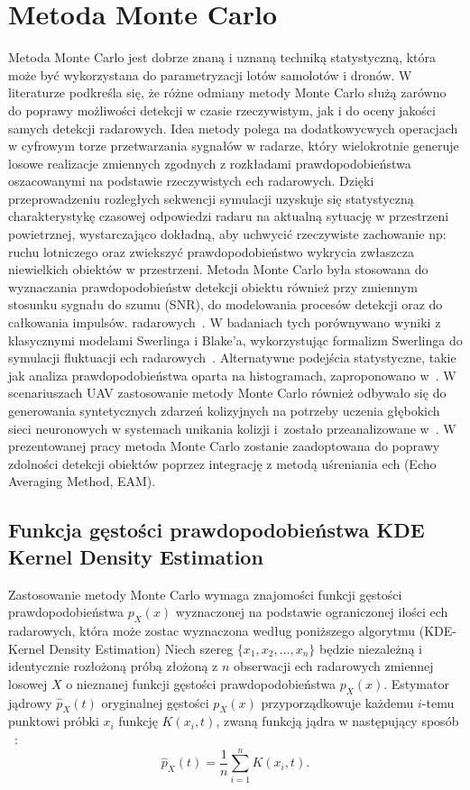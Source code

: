 
\section{Metoda Monte Carlo}
Metoda Monte Carlo jest dobrze znaną i uznaną techniką statystyczną, która może być wykorzystana do parametryzacji lotów samolotów i dronów. W literaturze podkreśla się, że różne odmiany metody Monte Carlo służą zarówno do poprawy możliwości detekcji w czasie rzeczywistym, jak i do oceny jakości samych detekcji radarowych. Idea metody polega na  dodatkowycwych operacjach  w cyfrowym torze przetwarzania sygnałów w radarze, który wielokrotnie generuje losowe realizacje zmiennych zgodnych z rozkładami prawdopodobieństwa oszacowanymi na podstawie rzeczywistych ech radarowych. Dzięki przeprowadzeniu rozległych sekwencji symulacji uzyskuje się statystyczną charakterystykę czasowej odpowiedzi radaru na aktualną sytuację w przestrzeni powietrznej, wystarczająco dokładną, aby uchwycić rzeczywiste zachowanie np: ruchu lotniczego oraz zwiekszyć prawdopodobieństwo wykrycia zwłaszcza niewielkich obiektów w przestrzeni.
Metoda Monte Carlo była stosowana do wyznaczania prawdopodobieństw detekcji obiektu również przy zmiennym stosunku sygnału do szumu (SNR), do modelowania procesów detekcji oraz do całkowania impulsów. radarowych~\cite{MC_Radar_Integracja}. W badaniach tych porównywano wyniki z klasycznymi modelami Swerlinga i Blake'a, wykorzystując formalizm Swerlinga do symulacji fluktuacji ech radarowych~\cite{Swerling1960}. Alternatywne podejścia statystyczne, takie jak analiza prawdopodobieństwa oparta na histogramach, zaproponowano w~\cite{HistogramApproach}. W scenariuszach UAV zastosowanie metody Monte Carlo również odbywało się do generowania syntetycznych zdarzeń kolizyjnych na potrzeby uczenia głębokich sieci neuronowych w systemach unikania kolizji i~zostało przeanalizowane w~\cite{MC_UAV_Collision}. 
W prezentowanej pracy metoda Monte Carlo zostanie zaadoptowana do poprawy zdolności detekcji obiektów poprzez integrację z metodą uśreniania ech (Echo Averaging Method, EAM). 

\subsection{Funkcja gęstości prawdopodobieństwa KDE Kernel Density Estimation}
Zastosowanie metody Monte Carlo wymaga znajomości funkcji gęstości prawdopodobieństwa \(p_X(x)\) wyznaczonej na podstawie ograniczonej ilości ech radarowych, która może zostac wyznaczona według poniższego algorytmu (KDE- Kernel Density Estimation)
Niech szereg \(\{x_1,x_2,\dots,x_n\}\) będzie niezależną i identycznie rozłożoną próbą złożoną z \(n\) obserwacji ech radarowych zmiennej losowej \(X\) o nieznanej funkcji gęstości prawdopodobieństwa \(p_X(x)\). Estymator jądrowy \(\hat p_X(t)\) oryginalnej gęstości \(p_X(x)\) przyporządkowuje każdemu \(i\)-temu punktowi próbki \(x_i\) funkcję \(K(x_i,t)\), zwaną funkcją jądra w następujący sposób ~\cite{Silverman1986}:
\begin{equation}
\hat p_X(t) = \frac{1}{n}\sum_{i=1}^{n} K(x_i,t).
\label{eq:kde_def}
\end{equation}

